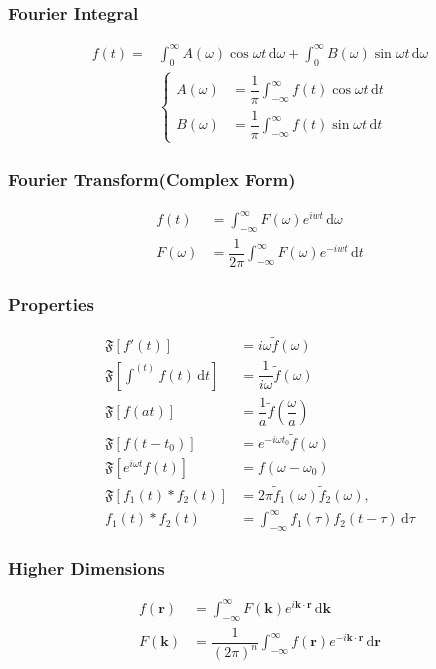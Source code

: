 \documentclass[10pt, a4paper]{article}
\def\d{\,\mathrm{d}}
\def\F{\mathfrak{F}}
\begin{document}
\begin{multicols}{2}
		\subsubsection{Fourier Integral}
		\begin{align}
			f(t) = &\int_0^\infty A(\omega)\cos{\omega t}\d \omega + \int_0^\infty B(\omega)\sin{\omega t}\d \omega\\
			&\left\{\begin{aligned}
				A(\omega) &= \dfrac{1}{\pi}\int_{-\infty}^\infty f(t)\cos{\omega t}\d t\\
				B(\omega) &= \dfrac{1}{\pi}\int_{-\infty}^\infty f(t)\sin{\omega t}\d t
			\end{aligned}\right.
		\end{align}
	
		\subsubsection{Fourier Transform(Complex Form)}
		\begin{align}
			f(t) &= \int_{-\infty}^{\infty}F(\omega)e^{iwt}\d\omega\\
			F(\omega) &= \dfrac{1}{2\pi}\int_{-\infty}^{\infty}F(\omega)e^{-iwt}\d t
		\end{align}
		
		\subsubsection{Properties}
		\begin{align}
			\F[f'(t)] &= i\omega\tilde{f}(\omega)\\
			\F[\int^{(t)}f(t)\d t] &= \dfrac{1}{i\omega}\tilde{f}(\omega)\\
			\F[f(at)] &= \dfrac{1}{a}\tilde{f}\left(\dfrac{\omega}{a}\right)\\
			\F[f(t-t_0)] &= e^{-i\omega t_0}\tilde{f}(\omega)\\
			\F[e^{i\omega t}f(t)] &= f(\omega-\omega_0)\\
			\F[f_1(t)*f_2(t)] &= 2\pi \tilde{f}_1(\omega) \tilde{f}_2(\omega), \\
			f_1(t)*f_2(t) &= \int_{-\infty}^{\infty}f_1(\tau)f_2(t-\tau)\d\tau
		\end{align}
	
		\subsubsection{Higher Dimensions}
		\begin{align}
			f(\bm{r}) &= \int_{-\infty}^\infty F(\bm{k}) e^{i\bm{k}\cdot\bm{r}}\d\bm{k}\\
			F(\bm{k}) &= \dfrac{1}{(2\pi)^n}\int_{-\infty}^\infty f(\bm{r}) e^{-i\bm{k}\cdot\bm{r}}\d\bm{r}
		\end{align}
	

\end{multicols}
\end{document}
